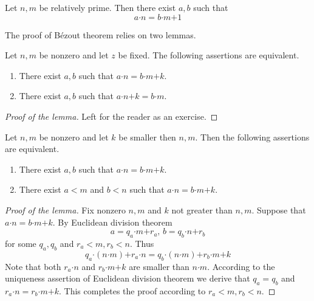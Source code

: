 \documentclass[10pt]{amsart}
\newcommand{\mle}{\boldsymbol{<}}
\newcommand{\meq}{\boldsymbol{=}}
\newcommand{\mplus}{\boldsymbol{+}}
\newcommand{\mdot}{\boldsymbol{\cdot}}
\newcommand{\theoremlabels}[2]{#1][#2}
\begin{document}
\begin{theorem}[\theoremlabels{$\mathrm{PRA}$}{B{\'e}zout theorem}]\label{theorem:bezout_theorem}
	Let $n,m$ be relatively prime. Then there exist $a,b$ such that
	$$a\mdot n \meq b\mdot m \mplus 1$$
\end{theorem}
\noindent
The proof of B{\'e}zout theorem relies on two lemmas.

\begin{lemma}\label{lemma:arithmetic_combination_side_does_not_matter}
	Let $n,m$ be nonzero and let $z$ be fixed. The following assertions are equivalent.
	\begin{enumerate}[label=\emph{\textbf{(\roman*)}}, leftmargin=3.0em]
		\item There exist $a,b$ such that $a\mdot n \meq b\mdot m \mplus k$.
		\item There exist $a,b$ such that $a\mdot n \mplus k \meq b\mdot m$.
	\end{enumerate}
\end{lemma}
\begin{proof}[Proof of the lemma]
	Left for the reader as an exercise.
\end{proof}

\begin{lemma}\label{lemma:arithmetic_combination_has_bounded_coefficients}
	Let $n,m$ be nonzero and let $k$ be smaller then $n,m$. Then the following assertions are equivalent.
	\begin{enumerate}[label=\emph{\textbf{(\roman*)}}, leftmargin=3.0em]
		\item There exist $a,b$ such that $a\mdot n \meq b\mdot m \mplus k$.
		\item There exist $a \mle m$ and $b \mle n$ such that $a\mdot n \meq b\mdot m \mplus k$.
	\end{enumerate}
\end{lemma}
\begin{proof}[Proof of the lemma]
	Fix nonzero $n,m$ and $k$ not greater than $n,m$. Suppose that $a\mdot n \meq b\mdot m \mplus k$. By Euclidean division theorem
	$$a \meq q_a\mdot m \mplus r_a,\,b \meq q_b \mdot n \mplus r_b$$
	for some $q_a,q_b$ and $r_a \mle m, r_b \mle n$. Thus
	$$q_a \mdot (n\mdot m) \mplus r_a \mdot n \meq q_b\mdot (n\mdot m) \mplus r_b\mdot m \mplus k$$
	Note that both $r_a \mdot n$ and $r_b \mdot m \mplus k$ are smaller than $n\mdot m$. According to the uniqueness assertion of Euclidean division theorem we derive that $q_a \meq q_b$ and $r_a\mdot n \meq r_b \mdot m \mplus k$. This completes the proof according to $r_a \mle m,r_b \mle n$.
\end{proof}
\end{document}
